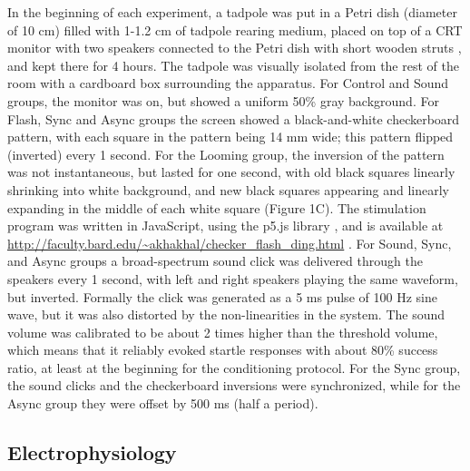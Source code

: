 \documentclass{article}
\begin{document}
In the beginning of each experiment, a tadpole was put in a Petri dish (diameter of 10 cm) filled with 1-1.2 cm of tadpole rearing medium, placed on top of a CRT monitor with two speakers connected to the Petri dish with short wooden struts \citep{james2015,truszkowski2017}, and kept there for 4 hours. The tadpole was visually isolated from the rest of the room with a cardboard box surrounding the apparatus. For Control and Sound groups, the monitor was on, but showed a uniform 50\% gray background. For Flash, Sync and Async groups the screen showed a black-and-white checkerboard pattern, with each square in the pattern being 14 mm wide; this pattern flipped (inverted) every 1 second. For the Looming group, the inversion of the pattern was not instantaneous, but lasted for one second, with old black squares linearly shrinking into white background, and new black squares appearing and linearly expanding in the middle of each white square (Figure 1C). The stimulation program was written in JavaScript, using the p5.js library \citep{mccarthy2015}, and is available at \url{http://faculty.bard.edu/~akhakhal/checker_flash_ding.html} . For Sound, Sync, and Async groups a broad-spectrum sound click was delivered through the speakers every 1 second, with left and right speakers playing the same waveform, but inverted. Formally the click was generated as a 5 ms pulse of 100 Hz sine wave, but it was also distorted by the non-linearities in the system. The sound volume was calibrated to be about 2 times higher than the threshold volume, which means that it reliably evoked startle responses with about 80\% success ratio, at least at the beginning for the conditioning protocol. For the Sync group, the sound clicks and the checkerboard inversions were synchronized, while for the Async group they were offset by 500 ms (half a period).

\subsection*{Electrophysiology}
\end{document}
